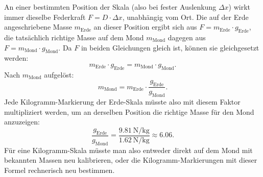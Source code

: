 \documentclass[addpoints,11pt,a4paper]{exam}
\begin{document}
\begin{questions}
\begin{groupbox}
\begin{parts}
\begin{solution}
  An einer bestimmten Position der Skala (also bei fester Auslenkung
  $\Delta x$) wirkt immer dieselbe Federkraft $F=D\cdot\Delta x$,
  unabhängig vom Ort. Die auf der Erde angeschriebene Masse $m_{\text{Erde}}$
  an dieser Position ergibt sich aus $F=m_{\text{Erde}}\cdot g_{\text{Erde}}$,
  die tatsächlich richtige Masse auf dem Mond $m_{\text{Mond}}$ dagegen aus
  $F=m_{\text{Mond}}\cdot g_{\text{Mond}}$. Da $F$ in beiden Gleichungen
  gleich ist, können sie gleichgesetzt werden:
  \[
    m_{\text{Erde}}\cdot g_{\text{Erde}} = m_{\text{Mond}}\cdot g_{\text{Mond}}.
  \]
  Nach $m_{\text{Mond}}$ aufgelöst:
  \[
    \boxed{m_{\text{Mond}} = m_{\text{Erde}}\cdot\frac{g_{\text{Erde}}}{g_{\text{Mond}}}}.
  \]
  Jede Kilogramm-Markierung der Erde-Skala müsste also mit diesem Faktor
  multipliziert werden, um an derselben Position die richtige Masse für
  den Mond anzuzeigen:
  \[
    \frac{g_{\text{Erde}}}{g_{\text{Mond}}} = \frac{\SI{9.81}{\newton\per\kilogram}}{\SI{1.62}{\newton\per\kilogram}} \approx 6.06.
  \]
  Für eine Kilogramm-Skala müsste man also entweder direkt auf dem Mond mit
  bekannten Massen neu kalibrieren, oder die Kilogramm-Markierungen mit
  dieser Formel rechnerisch neu bestimmen.
  \end{solution}
\end{parts}
\end{groupbox}
\end{questions}
\end{document}
